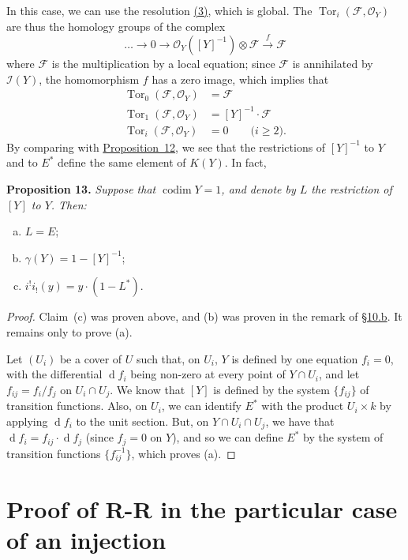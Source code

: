 \documentclass{article}
\newenvironment{itenv}[1]
  {\phantomsection\par\medskip\noindent\textbf{#1.}\itshape}
  {\par\medskip}
\newcommand{\scr}[1]{{\mathscr{#1}}}
\newcommand{\dd}{\operatorname{d}\!}
\renewcommand{\geq}{\geqslant}
\DeclareMathOperator{\Tor}{Tor}
\DeclareMathOperator{\codim}{codim}
\newcommand{\oldpage}[1]{\marginpar{\footnotesize$\Big\vert$ \textit{p.~#1}}}
\begin{document}
In this case, we can use the resolution \hyperref[equation3]{(3)}, which is global.
The $\Tor_i(\scr{F},\scr{O}_Y)$ are thus the homology groups of the complex
\[
  \ldots \to 0 \to \scr{O}_Y([Y]^{-1})\otimes\scr{F} \xrightarrow{f}\scr{F}
\]
where $\scr{F}$ is the multiplication by a local equation;
since $\scr{F}$ is annihilated by $\scr{I}(Y)$, the homomorphism $f$ has a zero image, which implies that
\begin{align*}
  \Tor_0(\scr{F},\scr{O}_Y) &= \scr{F}
\\\Tor_1(\scr{F},\scr{O}_Y) &= [Y]^{-1}\cdot\scr{F}
\\\Tor_i(\scr{F},\scr{O}_Y) &= 0 \qquad\mbox{($i\geq2$).}
\end{align*}
By comparing with \hyperref[proposition12]{Proposition~12}, we see that the restrictions of $[Y]^{-1}$ to $Y$ and to $E^*$ define the same element of $K(Y)$.
In fact,
\begin{itenv}{Proposition 13}
\label{proposition13}
  Suppose that $\codim Y=1$, and denote by $L$ the restriction of $[Y]$ to $Y$.
  Then:
  \begin{enumerate}[(a)]
    \item $L=E$;
    \item $\gamma(Y) = 1-[Y]^{-1}$;
    \item $i^!i_!(y) = y\cdot(1-L^*).$
  \end{enumerate}
\end{itenv}

\begin{proof}
\oldpage{124}
  Claim~(c) was proven above, and (b) was proven in the remark of \hyperref[subsection10b]{\S10.b}.
  It remains only to prove (a).

  Let $(U_i)$ be a cover of $U$ such that, on $U_i$, $Y$ is defined by one equation $f_i=0$, with the differential $\dd f_i$ being non-zero at every point of $Y\cap U_i$, and let $f_{ij}=f_i/f_j$ on $U_i\cap U_j$.
  We know that $[Y]$ is defined by the system $\{f_{ij}\}$ of transition functions.
  Also, on $U_i$, we can identify $E^*$ with the product $U_i\times k$ by applying $\dd f_i$ to the unit section.
  But, on $Y\cap U_i\cap U_j$, we have that $\dd f_i=f_{ij}\cdot\dd f_j$ (since $f_j=0$ on $Y$), and so we can define $E^*$ by the system of transition functions $\{f_{ij}^{-1}\}$, which proves (a).
\end{proof}


\section{Proof of R-R in the particular case of an injection}
\label{section11}
\end{document}
